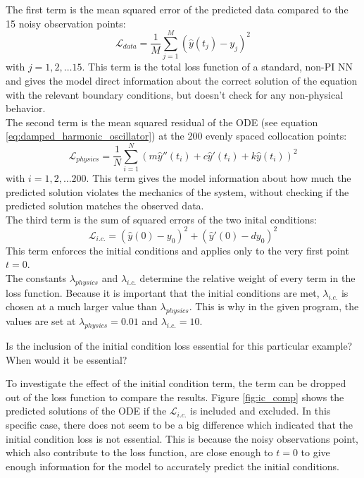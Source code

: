 \documentclass[we,twoside,openright,a4paper,11pt]{uantwerpenbamathesis}
\begin{document}
The first term is the mean squared error of the predicted data compared to the 15 noisy observation points:
\begin{equation}\label{eq:loss_data_DHO}
    \mathcal{L}_{data}=\frac{1}{M}\sum_{j=1}^M \left(\hat{y}(t_j)-y_j\right)^2
\end{equation}
with $j=1, 2, \ldots 15$. This term is the total loss function of a standard, non-PI NN and gives the model direct information about the correct solution of the equation with the relevant boundary conditions, but doesn't check for any non-physical behavior.\\

The second term is the mean squared residual of the ODE (see equation \ref{eq:damped_harmonic_oscillator}) at the 200 evenly spaced collocation points:
\begin{equation}\label{eq:loss_physics_DHO}
    \mathcal{L}_{physics}=\frac{1}{N}\sum_{i=1}^N \left(m\hat{y}''(t_i)+c\hat{y}'(t_i)+k\hat{y}(t_i)\right)^2
\end{equation}
with $i=1, 2, \ldots 200$. This term gives the model information about how much the predicted solution violates the mechanics of the system, without checking if the predicted solution matches the observed data.\\

The third term is the sum of squared errors of the two inital conditions:
\begin{equation}\label{eq:loss_i.c._DHO}
    \mathcal{L}_{i.c.}=\left(\hat{y}(0)-y_0\right)^2+\left(\hat{y}'(0)-dy_0\right)^2
\end{equation}
This term enforces the initial conditions and applies only to the very first point $t=0$.\\

The constants $\lambda_{physics}$ and $\lambda_{i.c.}$ determine the relative weight of every term in the loss function. Because it is important that the initial conditions are met, $\lambda_{i.c.}$ is chosen at a much larger value than $\lambda_{physics}$. This is why in the given program, the values are set at $\lambda_{physics}=0.01$ and $\lambda_{i.c.}=10$.


\begin{tcolorbox}[title=Question 2, colback=blue!10!white, colframe=blue!40!white, sharp corners]
    Is the inclusion of the initial condition loss essential for this particular example? When would it be essential?
\end{tcolorbox}

To investigate the effect of the initial condition term, the term can be dropped out of the loss function to compare the results. Figure \ref{fig:ic_comp} shows the predicted solutions of the ODE if the $\mathcal{L}_{i.c.}$ is included and excluded. In this specific case, there does not seem to be a big difference which indicated that the initial condition loss is not essential. This is because the noisy observations point, which also contribute to the loss function, are close enough to $t=0$ to give enough information for the model to accurately predict the initial conditions.
\end{document}
